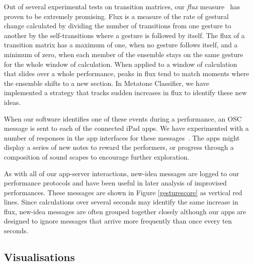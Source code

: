 \documentclass[graybox]{svmult}
\begin{document}
Out of several experimental tests on transition matrices, our
\emph{flux} measure~\cite{Martin:2015jk} has proven to be extremely
promising. Flux is a measure of the rate of gestural change calculated
by dividing the number of transitions from one gesture to another by
the self-transitions where a gesture is followed by itself. The flux
of a transition matrix has a maximum of one, when no gesture follows
itself, and a minimum of zero, when each member of the ensemble stays
on the same gesture for the whole window of calculation. When applied
to a window of calculation that slides over a whole performance, peaks
in flux tend to match moments where the ensemble shifts to a new
section. In Metatone Classifier, we have implemented a strategy that
tracks sudden increases in flux to identify these new ideas.

When our software identifies one of these events during a performance,
an OSC message is sent to each of the connected iPad apps. We have
experimented with a number of responses in the app interfaces for
these messages~\cite{Martin:2015jk}. The apps might display a series
of new notes to reward the performers, or progress through a
composition of sound scapes to encourage further exploration.

As with all of our app-server interactions, new-idea messages are
logged to our performance protocols and have been useful in later
analysis of improvised performances. These messages are shown in
Figure \ref{gesturescore} as vertical red lines. Since calculations
over several seconds may identify the same increase in flux, new-idea
messages are often grouped together closely although our apps are
designed to ignore messages that arrive more frequently than once
every ten seconds. 

\subsection{Visualisations}
\label{subsec:visualisations}
\end{document}
